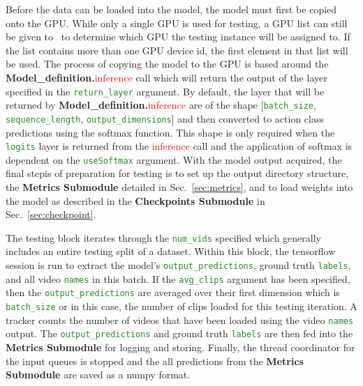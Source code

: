 \documentclass{llncs}
\begin{document}
Before the data can be loaded into the model, the model must first be copied onto the GPU.
While only a single GPU is used for testing, a GPU list can still be given to \acro~to determine which GPU the testing instance will be assigned to.
If the list contains more than one GPU device id, the first element in that list will be used.
The process of copying the model to the GPU is based around the \textbf{Model\_definition.}\textcolor{red}{inference} call which will return the output of the layer specified in the \texttt{\textcolor{ForestGreen}{return\_layer}} argument.
By default, the layer that will be returned by \textbf{Model\_definition.}\textcolor{red}{inference} are of the shape [\texttt{\textcolor{ForestGreen}{batch\_size}}, \texttt{\textcolor{ForestGreen}{sequence\_length}}, \texttt{\textcolor{ForestGreen}{output\_dimensions}}] and then converted to action class predictions using the softmax function.
This shape is only required when the \texttt{\textcolor{ForestGreen}{logits}} layer is returned from the \textcolor{red}{inference} call and the application of softmax is dependent on the \texttt{\textcolor{ForestGreen}{useSoftmax}} argument.
With the model output acquired, the final stepis of preparation for testing is to set up the output directory structure, the \textbf{Metrics Submodule} detailed in Sec.~\ref{sec:metrics}, and to load weights into the model as described in the \textbf{Checkpoints Submodule} in Sec.~\ref{sec:checkpoint}.

The testing block iterates through the \texttt{\textcolor{ForestGreen}{num\_vids}} specified which generally includes an entire testing split of a dataset.
Within this block, the tensorflow session is run to extract the model's \texttt{\textcolor{ForestGreen}{output\_predictions}}, ground truth \texttt{\textcolor{ForestGreen}{labels}}, and all video \texttt{\textcolor{ForestGreen}{names}} in this batch.
If the \texttt{\textcolor{ForestGreen}{avg\_clips}} argument has been specified, then the \texttt{\textcolor{ForestGreen}{output\_predictions}} are averaged over their first dimension which is \texttt{\textcolor{ForestGreen}{batch\_size}} or in this case, the number of clips loaded for this testing iteration.
A tracker counts the number of videos that have been loaded using the video \texttt{\textcolor{ForestGreen}{names}} output.
The \texttt{\textcolor{ForestGreen}{output\_predictions}} and ground truth \texttt{\textcolor{ForestGreen}{labels}} are then fed into the \textbf{Metrics Submodule} for logging and storing.
Finally, the thread coordinator for the input queues is stopped and the all predictions from the \textbf{Metrics Submodule} are saved as a numpy format.
\end{document}
